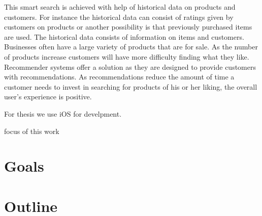 This smart search is achieved with help of historical data on products and customers. For instance the historical data can consist of ratings given by customers on products or another possibility is that previously purchased items are used. The historical data consists of information on items and customers. Businesses often have a large variety of products that are for sale. As the number of products increase customers will have more difficulty finding what they like. Recommender systems offer a solution as they are designed to provide customers with recommendations. As recommendations reduce the amount of time a customer needs to invest in searching for products of his or her liking, the overall user’s experience is positive.\newline


For thesis we use iOS for develpment.

focus of  this work

\section{Goals}

\section{Outline}